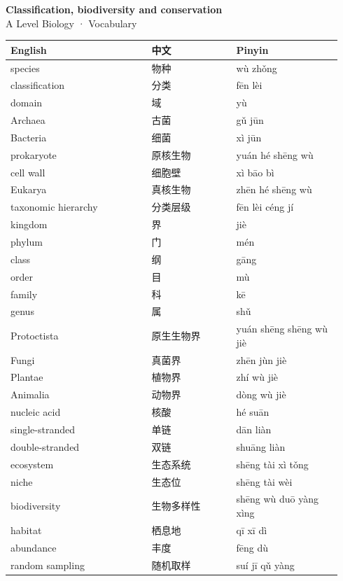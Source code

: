 \documentclass[11pt]{article}
\begin{document}
\begin{center}
  {\LARGE\bfseries Classification, biodiversity and conservation}\\[0.35em]
  {\large A Level Biology · Vocabulary}
\end{center}
\vspace{0.6em}

\begin{longtable}{@{}p{0.40\linewidth}p{0.24\linewidth}p{0.30\linewidth}@{}}
\toprule
\textbf{English} & \textbf{中文} & \textbf{Pinyin} \\
\midrule
\endhead
\bottomrule
\endlastfoot
species & 物种 & wù zhǒng \\
classification & 分类 & fēn lèi \\
domain & 域 & yù \\
Archaea & 古菌 & gǔ jūn \\
Bacteria & 细菌 & xì jūn \\
prokaryote & 原核生物 & yuán hé shēng wù \\
cell wall & 细胞壁 & xì bāo bì \\
Eukarya & 真核生物 & zhēn hé shēng wù \\
taxonomic hierarchy & 分类层级 & fēn lèi céng jí \\
kingdom & 界 & jiè \\
phylum & 门 & mén \\
class & 纲 & gāng \\
order & 目 & mù \\
family & 科 & kē \\
genus & 属 & shǔ \\
Protoctista & 原生生物界 & yuán shēng shēng wù jiè \\
Fungi & 真菌界 & zhēn jùn jiè \\
Plantae & 植物界 & zhí wù jiè \\
Animalia & 动物界 & dòng wù jiè \\
nucleic acid & 核酸 & hé suān \\
single-stranded & 单链 & dān liàn \\
double-stranded & 双链 & shuāng liàn \\
ecosystem & 生态系统 & shēng tài xì tǒng \\
niche & 生态位 & shēng tài wèi \\
biodiversity & 生物多样性 & shēng wù duō yàng xìng \\
habitat & 栖息地 & qī xī dì \\
abundance & 丰度 & fēng dù \\
random sampling & 随机取样 & suí jī qǔ yàng \\

\end{longtable}
\end{document}
